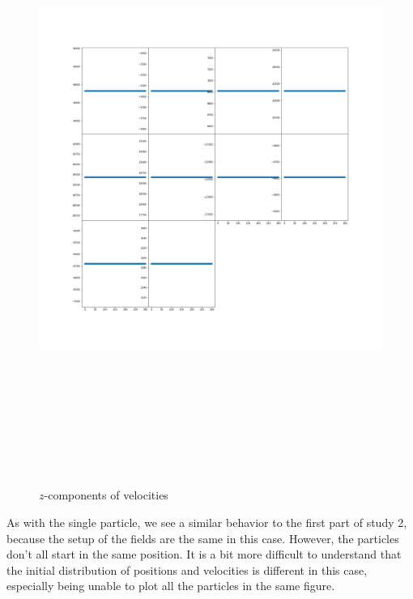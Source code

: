 \documentclass[12pt]{article}
\begin{document}
	\begin{figure}[H]
		\includegraphics[width=\linewidth, height=20cm]{subvsz3Bz.png} \caption{$z$-components of velocities} \label{subvsz3Bz}
	\end{figure}
	As with the single particle, we see a similar behavior to the first part of study 2, because the setup of the fields are the same in this case. However, the particles don't all start in the same position. It is a bit more difficult to understand that the initial distribution of positions and velocities is different in this case, especially being unable to plot all the particles in the same figure.
\end{document}
